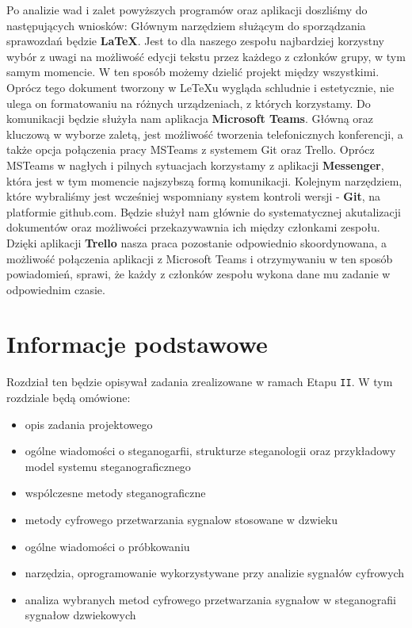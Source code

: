 \documentclass[a4paper,titleauthor]{mwart}
\begin{document}
Po analizie wad i zalet powyższych programów oraz aplikacji doszliśmy do następujących wniosków: \newline
Głównym narzędziem służącym do sporządzania sprawozdań będzie \textbf{LaTeX}. Jest to dla naszego zespołu najbardziej korzystny wybór z uwagi na możliwość edycji tekstu przez każdego z członków grupy, w tym samym momencie. W ten sposób możemy dzielić projekt między wszystkimi. Oprócz tego dokument tworzony w LeTeXu wygląda schludnie i estetycznie, nie ulega on formatowaniu na różnych urządzeniach, z których korzystamy. 
Do komunikacji będzie służyła nam aplikacja \textbf{Microsoft Teams}. Główną oraz kluczową w wyborze zaletą, jest możliwość tworzenia telefonicznych konferencji, a także opcja połączenia pracy MSTeams z systemem Git oraz Trello.
Oprócz MSTeams w nagłych i pilnych sytuacjach korzystamy z aplikacji \textbf{Messenger}, która jest w tym momencie najszybszą formą komunikacji. 
Kolejnym narzędziem, które wybraliśmy jest wcześniej wspomniany system kontroli wersji - \textbf{Git}, na platformie github.com.
Będzie służył nam głównie do systematycznej akutalizacji dokumentów oraz możliwości przekazywawnia ich między członkami zespołu. 
Dzięki aplikacji \textbf{Trello} nasza praca pozostanie odpowiednio skoordynowana, a możliwość połączenia aplikacji z Microsoft Teams i otrzymywaniu w ten sposób powiadomień, sprawi, że każdy z członków zespołu wykona dane mu zadanie w odpowiednim czasie. 

\section{Informacje podstawowe}
\label{sec:informacje_podstawowe} 
Rozdział ten będzie opisywał zadania zrealizowane w ramach Etapu \texttt{II}. W tym rozdziale będą omówione:\newline 
\begin{itemize}
	\item opis zadania projektowego 
	\item ogólne wiadomości o steganogarfii, strukturze steganologii oraz przykładowy model systemu steganograficznego
	\item wspólczesne metody steganograficzne
	\item metody cyfrowego przetwarzania sygnalow stosowane w dzwieku
	\item ogólne wiadomości o próbkowaniu
	\item narzędzia, oprogramowanie wykorzystywane przy analizie sygnałów cyfrowych
	\item analiza wybranych metod cyfrowego przetwarzania sygnałow w steganografii sygnałow dzwiekowych 
	\end{itemize} 
\end{document}
